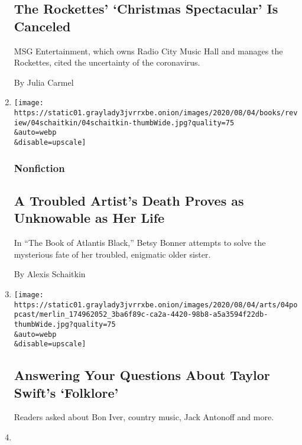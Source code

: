 \begin{enumerate}
{  \subsection{The Rockettes' `Christmas Spectacular' Is
  Canceled}\label{the-rockettes-christmas-spectacular-is-canceled}}

  MSG Entertainment, which owns Radio City Music Hall and manages the
  Rockettes, cited the uncertainty of the coronavirus.

  By Julia Carmel
\item
  \href{/2020/08/04/books/review/betsy-bonner-the-book-of-atlantis-black.html}{}

  \texttt{[image: https://static01.graylady3jvrrxbe.onion/images/2020/08/04/books/review/04schaitkin/04schaitkin-thumbWide.jpg?quality=75\\\&auto=webp\\\&disable=upscale]}

  \hypertarget{nonfiction}{%
  \subsubsection{Nonfiction}\label{nonfiction}}

  \hypertarget{a-troubled-artists-death-proves-as-unknowable-as-her-life}{%
  \subsection{A Troubled Artist's Death Proves as Unknowable as Her
  Life}\label{a-troubled-artists-death-proves-as-unknowable-as-her-life}}

  In ``The Book of Atlantis Black,'' Betsy Bonner attempts to solve the
  mysterious fate of her troubled, enigmatic older sister.

  By Alexis Schaitkin
\item
  \href{/2020/08/04/arts/music/taylor-swift-folklore-questions.html}{}

  \texttt{[image: https://static01.graylady3jvrrxbe.onion/images/2020/08/04/arts/04popcast/merlin\_174962052\_3ba6f89c-ca2a-4420-98b8-a5a3594f22db-thumbWide.jpg?quality=75\\\&auto=webp\\\&disable=upscale]}

  \hypertarget{answering-your-questions-about-taylor-swifts-folklore}{%
  \subsection{Answering Your Questions About Taylor Swift's
  `Folklore'}\label{answering-your-questions-about-taylor-swifts-folklore}}

  Readers asked about Bon Iver, country music, Jack Antonoff and more.
\item
  \href{/2020/08/04/movies/red-penguins-review.html}{}


\end{enumerate}
